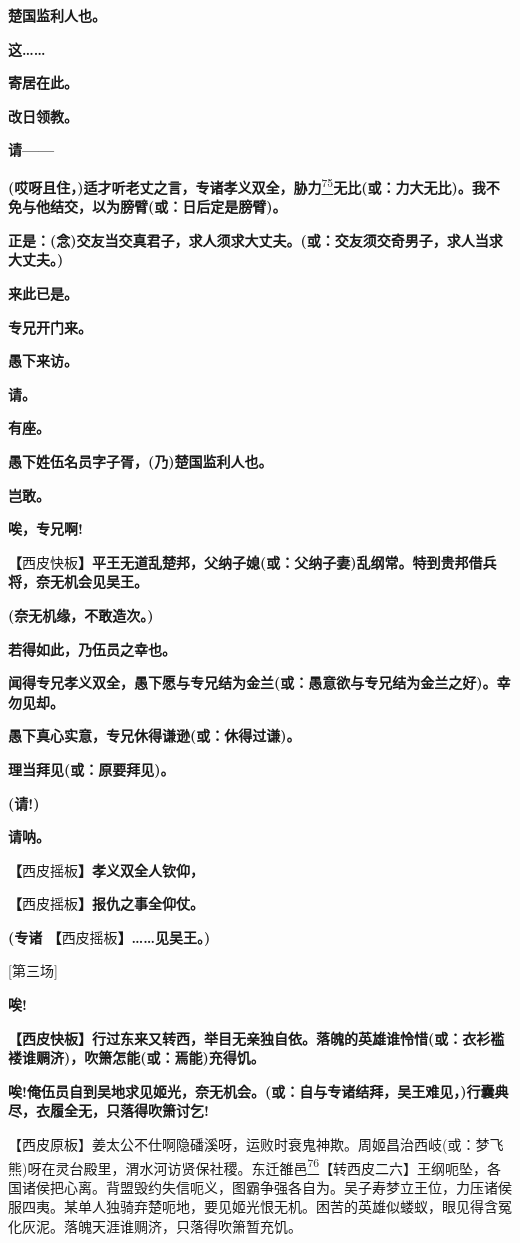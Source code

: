 \textbf{楚国监利人也。}

\textbf{这\ldots{}\ldots{}}

\textbf{寄居在此。}

\textbf{改日领教。}

\textbf{请------}

\textbf{(哎呀且住，)适才听老丈之言，专诸孝义双全，胁力}\protect\hyperlink{fn75}{\textsuperscript{75}}\textbf{无比(或：力大无比)。我不免与他结交，以为膀臂(或：日后定是膀臂)。}

\textbf{正是：(念)交友当交真君子，求人须求大丈夫。(或：交友须交奇男子，求人当求大丈夫。)}

\textbf{来此已是。}

\textbf{专兄开门来。}

\textbf{愚下来访。}

\textbf{请。}

\textbf{有座。}

\textbf{愚下姓伍名员字子胥，(乃)楚国监利人也。}

\textbf{岂敢。}

\textbf{唉，专兄啊!}

\textbf{【}西皮快板\textbf{】平王无道乱楚邦，父纳子媳(或：父纳子妻)乱纲常。特到贵邦借兵将，奈无机会见吴王。}

\textbf{(奈无机缘，不敢造次。)}

\textbf{若得如此，乃伍员之幸也。}

\textbf{闻得专兄孝义双全，愚下愿与专兄结为金兰(或：愚意欲与专兄结为金兰之好)。幸勿见却。}

\textbf{愚下真心实意，专兄休得谦逊(或：休得过谦)。}

\textbf{理当拜见(或：原要拜见)。}

\textbf{(请!)}

\textbf{请呐。}

\textbf{【}西皮摇板\textbf{】孝义双全人钦仰，}

\textbf{【}西皮摇板\textbf{】报仇之事全仰仗。}

\textbf{(专诸 【}西皮摇板\textbf{】\ldots{}\ldots{}见吴王。)}

{[}第三场{]}

\textbf{唉!}

\textbf{【西皮快板】行过东来又转西，举目无亲独自依。落魄的英雄谁怜惜(或：衣衫褴褛谁赒济)，吹箫怎能(或：焉能)充得饥。}

\textbf{唉!俺伍员自到吴地求见姬光，奈无机会。(或：自与专诸结拜，吴王难见，)行囊典尽，衣履全无，只落得吹箫讨乞!}

【西皮原板】姜太公不仕啊隐磻溪呀，运败时衰鬼神欺。周姬昌治西岐(或：梦飞熊)呀在灵台殿里，渭水河访贤保社稷。东迁雒邑\protect\hyperlink{fn76}{\textsuperscript{76}}【转西皮二六】王纲呃坠，各国诸侯把心离。背盟毁约失信呃义，图霸争强各自为。吴子寿梦立王位，力压诸侯服四夷。某单人独骑弃楚呃地，要见姬光恨无机。困苦的英雄似蝼蚁，眼见得含冤化灰泥。落魄天涯谁赒济，只落得吹箫暂充饥。

